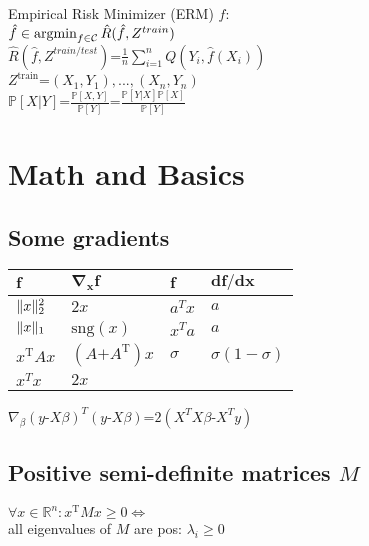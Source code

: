Empirical Risk Minimizer (ERM) $\hat{f}$:\\
$\hat{f} \in \mathop{\mathrm{argmin}}_{f \in \mathcal{C}} \hat{R}(\hat{f}, Z^{train})$\\
$\hat{R}(\hat{f}, Z^{train/test}) \text{=} \frac{1}{n} \sum_{i\text{=}1}^n Q(Y_i, \hat{f}(X_i))$\\

$Z^\text{train}\text{=}{(X_1,Y_1),...,(X_n,Y_n)}$ \\


$\mathbb{P}[X|Y]\text{=}\frac{\mathbb{P}[X,Y]}{\mathbb{P}[Y]}\text{=}\frac{\mathbb{P}[Y|X]\mathbb{P}[X]}{\mathbb{P}[Y]}$
\section*{Math and Basics}
\subsection*{Some gradients}
\begin{minipage}[t][][t]{\columnwidth}
\begin{tabular}{ p{} | p{} ||p{} | p{}}
		$\mathbf{f}$ & $\mathbf{\nabla_x f}$ & $\mathbf{f}$ & $\mathbf{{d f} / {d x}}$\\\hline
  		$\|x\|_2^2$ &  $2x$ & ${a}^Tx$ &  $a$\\
  		$\|x\|_1$  & $\text{sng}(x)$ &  $x^Ta$ & $a$\\
  		$x^\text{T} A x$ & $(A \text{+} A^\text{T}) x$  & $\sigma$  & $\sigma(1{-}\sigma)$ \\	
  		$x^Tx$ & $2x$	 & &
\end{tabular}
\end{minipage}


$\nabla_\beta (y \text{-} X\beta)^T(y\text{-}X\beta) \text{=} 2(X^TX\beta \text{-} X^Ty ) $


\subsection*{Positive semi-definite matrices $M$}
$\forall x \in \mathbb{R}^n: x^\text{T}Mx \geq 0 \Leftrightarrow$\\
all eigenvalues of $M$ are pos: $\lambda_i\geq 0$\\

